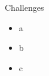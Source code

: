 \begin{frame}{Challenges}
  \begin{card}
    \begin{itemize}
      \item a
      \item b
      \item c
    \end{itemize}
  \end{card}
\end{frame}
